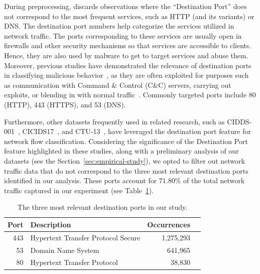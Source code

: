 

During preprocessing, \droidxpflow discards observations where the ``Destination Port'' does not correspond to the most frequent services,
such as HTTP (and its variants) or DNS. The destination port numbers help categorize the services utilized in network traffic. The ports corresponding to these services are usually open in firewalls and other security mechanisms so that services are accessible to clients. Hence, they are also used by malware to get to target services and abuse them. Moreover, 
previous studies have demonstrated the relevance of destination ports in classifying malicious behavior~\cite{DBLP:journals/compsec/UmerSB17,DBLP:journals/comsur/SperottoSSMPS10},
as they are often exploited for purposes such as communication with Command \& Control (C\&C) servers, carrying out exploits,
or blending in with normal traffic~\cite{DBLP:journals/comsur/SperottoSSMPS10}. Commonly targeted ports include 80 (HTTP), 443 (HTTPS), and 53 (DNS).

Furthermore, other datasets frequently used in related research, such as CIDDS-001~\cite{Ring2017FlowbasedBD}, CICIDS17~\cite{DBLP:conf/icict/MahfouzVS19},
and CTU-13~\cite{DBLP:journals/compsec/GarciaGSZ14}, have leveraged the destination port feature for network flow classification.
Considering the significance of the Destination Port feature highlighted in these studies, along with a preliminary analysis of our datasets
(see the Section~\ref{sec:empirical-study}), we opted to filter out network traffic data that do not correspond to the three most
relevant destination ports identified in our analysis. These ports account for $71.80\%$ of the total network traffic captured in our experiment
(see Table~\ref{tab:port}).

\begin{table}[h]
\centering
\caption{The three most relevant destination ports in our study.}
\begin{small}
\begin{tabular}{rlrl} 
\hline
Port & Description & Occurrences \\ 
\hline
443 & Hypertext Transfer Protocol Secure & 1,275,293 \\ 
53 & Domain Name System & 641,965 \\ 
80 & Hypertext Transfer Protocol & 38,830 \\ 
\hline
\end{tabular}
\end{small}
\label{tab:port}
\end{table}


